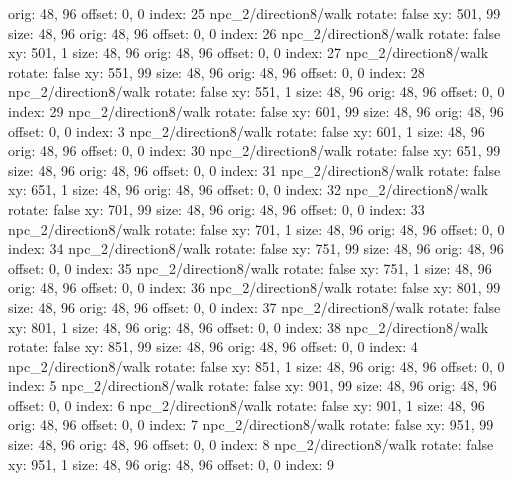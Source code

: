   orig: 48, 96
  offset: 0, 0
  index: 25
npc_2/direction8/walk
  rotate: false
  xy: 501, 99
  size: 48, 96
  orig: 48, 96
  offset: 0, 0
  index: 26
npc_2/direction8/walk
  rotate: false
  xy: 501, 1
  size: 48, 96
  orig: 48, 96
  offset: 0, 0
  index: 27
npc_2/direction8/walk
  rotate: false
  xy: 551, 99
  size: 48, 96
  orig: 48, 96
  offset: 0, 0
  index: 28
npc_2/direction8/walk
  rotate: false
  xy: 551, 1
  size: 48, 96
  orig: 48, 96
  offset: 0, 0
  index: 29
npc_2/direction8/walk
  rotate: false
  xy: 601, 99
  size: 48, 96
  orig: 48, 96
  offset: 0, 0
  index: 3
npc_2/direction8/walk
  rotate: false
  xy: 601, 1
  size: 48, 96
  orig: 48, 96
  offset: 0, 0
  index: 30
npc_2/direction8/walk
  rotate: false
  xy: 651, 99
  size: 48, 96
  orig: 48, 96
  offset: 0, 0
  index: 31
npc_2/direction8/walk
  rotate: false
  xy: 651, 1
  size: 48, 96
  orig: 48, 96
  offset: 0, 0
  index: 32
npc_2/direction8/walk
  rotate: false
  xy: 701, 99
  size: 48, 96
  orig: 48, 96
  offset: 0, 0
  index: 33
npc_2/direction8/walk
  rotate: false
  xy: 701, 1
  size: 48, 96
  orig: 48, 96
  offset: 0, 0
  index: 34
npc_2/direction8/walk
  rotate: false
  xy: 751, 99
  size: 48, 96
  orig: 48, 96
  offset: 0, 0
  index: 35
npc_2/direction8/walk
  rotate: false
  xy: 751, 1
  size: 48, 96
  orig: 48, 96
  offset: 0, 0
  index: 36
npc_2/direction8/walk
  rotate: false
  xy: 801, 99
  size: 48, 96
  orig: 48, 96
  offset: 0, 0
  index: 37
npc_2/direction8/walk
  rotate: false
  xy: 801, 1
  size: 48, 96
  orig: 48, 96
  offset: 0, 0
  index: 38
npc_2/direction8/walk
  rotate: false
  xy: 851, 99
  size: 48, 96
  orig: 48, 96
  offset: 0, 0
  index: 4
npc_2/direction8/walk
  rotate: false
  xy: 851, 1
  size: 48, 96
  orig: 48, 96
  offset: 0, 0
  index: 5
npc_2/direction8/walk
  rotate: false
  xy: 901, 99
  size: 48, 96
  orig: 48, 96
  offset: 0, 0
  index: 6
npc_2/direction8/walk
  rotate: false
  xy: 901, 1
  size: 48, 96
  orig: 48, 96
  offset: 0, 0
  index: 7
npc_2/direction8/walk
  rotate: false
  xy: 951, 99
  size: 48, 96
  orig: 48, 96
  offset: 0, 0
  index: 8
npc_2/direction8/walk
  rotate: false
  xy: 951, 1
  size: 48, 96
  orig: 48, 96
  offset: 0, 0
  index: 9

